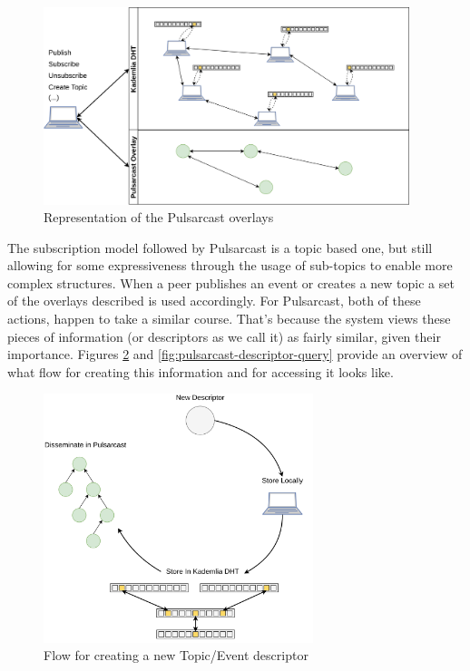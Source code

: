 \begin{figure}[hb!]
  \centering
  \includegraphics[width=0.95\textwidth]{img/pulsarcast-overlays.png}
  \caption{Representation of the Pulsarcast overlays}
  \label{fig:pulsarcast-overlays}
\end{figure}

The subscription model followed by Pulsarcast is a topic based one, but still
allowing for some expressiveness through the usage of sub-topics to enable more
complex structures. When a peer publishes an event or creates a new topic a set
of the overlays described is used accordingly. For Pulsarcast, both of these
actions, happen to take a similar course. That's because the system views these
pieces of information (or descriptors as we call it) as fairly similar, given
their importance. Figures \ref{fig:pulsarcast-descriptor-creation} and
\ref{fig:pulsarcast-descriptor-query} provide an overview of what flow for
creating this information and for accessing it looks like.

\begin{figure}[hb!]
  \centering
  \includegraphics[width=0.7\textwidth]{img/pulsarcast-descriptor-creation.png}
  \caption{Flow for creating a new Topic/Event descriptor}
  \label{fig:pulsarcast-descriptor-creation}
\end{figure}

